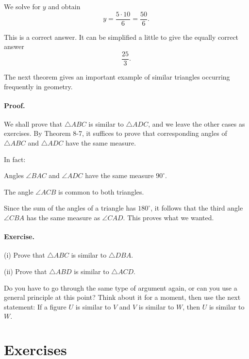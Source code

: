 \documentclass[12pt]{book} %
\begin{document}
We solve for $y$ and obtain
\[
y=\frac{5\cdot 10}{6}=\frac{50}{6}.
\]

This is a correct answer. It can be simplified a little to give the equally correct answer
\[
\frac{25}{3}.
\]

The next theorem gives an important example of similar triangles occurring frequently in geometry.


\paragraph{Proof.}
We shall prove that $\triangle ABC$ is similar to $\triangle ADC$, and we leave the other cases as exercises. By Theorem 8-7, it suffices to prove that corresponding angles of $\triangle ABC$ and $\triangle ADC$ have the same measure.


In fact:

Angles $\angle BAC$ and $\angle ADC$ have the same measure $90^\circ$.

The angle $\angle ACB$ is common to both triangles.

Since the sum of the angles of a triangle has $180^\circ$, it follows that the third angle $\angle CBA$ has the same measure as $\angle CAD$. This proves what we wanted.

\paragraph{Exercise.}
(i) Prove that $\triangle ABC$ is similar to $\triangle DBA$.

(ii) Prove that $\triangle ABD$ is similar to $\triangle ACD$.

Do you have to go through the same type of argument again, or can you use a general principle at this point? Think about it for a moment, then use the next statement: If a figure $U$ is similar to $V$ and $V$ is similar to $W$, then $U$ is similar to $W$.

\section*{Exercises}
\end{document}
